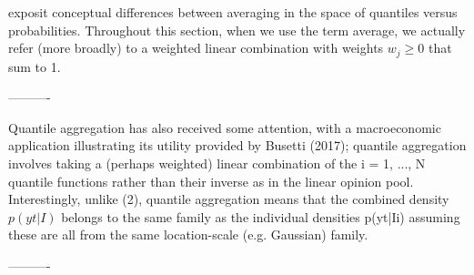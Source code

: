 \documentclass[11pt]{article}
\begin{document}
exposit conceptual differences between averaging in the space of quantiles versus probabilities. Throughout this section, when we use the term average, we actually refer (more broadly) to a weighted linear combination with weights $w_{j}\geq 0$ that sum to 1.


----------\-

Quantile aggregation has also received some attention, with a macroeconomic application illustrating its utility provided by Busetti (2017); quantile aggregation involves taking a (perhaps weighted) linear combination of the i = 1, ..., N quantile functions rather than their inverse as in the linear opinion pool.
Interestingly, unlike (2), quantile aggregation means that the combined density $p(yt|I)$ belongs to the same family as the individual densities p(yt|Ii) assuming these are all from the same location-scale (e.g. Gaussian) family.

----------\-
\end{document}
